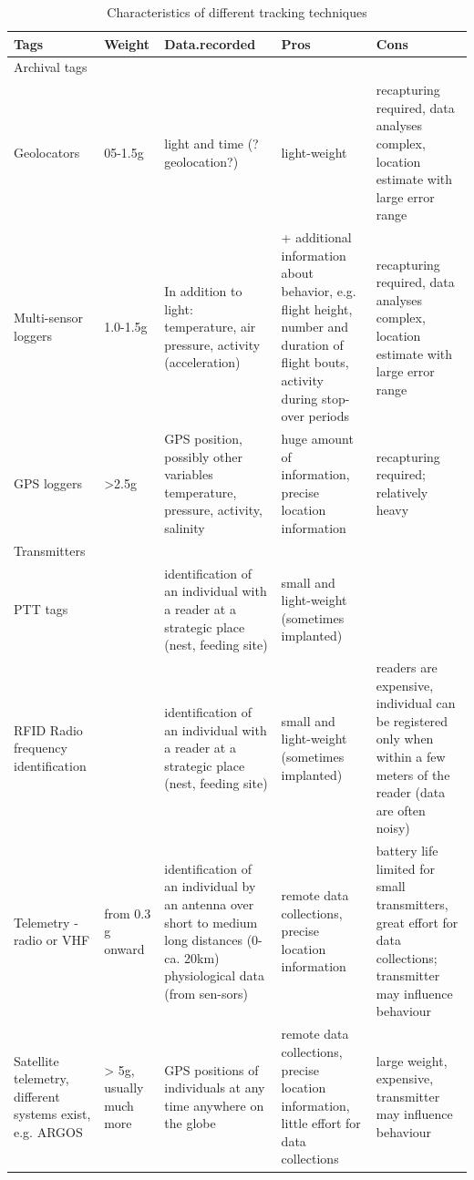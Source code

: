 \documentclass[
]{book}
\begin{document}
\begin{table}
\caption{\label{tab:TrackTechnology}\label{tab:TrackTechnology}Characteristics of different tracking techniques}
\centering
\begin{tabular}[t]{lllll}
\toprule
Tags & Weight & Data.recorded & Pros & Cons\\
\midrule
Archival tags &  &  &  & \\
Geolocators & 05-1.5g & light and time (?geolocation?) & light-weight & recapturing required, data analyses complex, location estimate with large error range\\
Multi-sensor loggers & 1.0-1.5g & In addition to light: temperature, air pressure, activity (acceleration) & + additional information about behavior, e.g. flight height, number and duration of flight bouts, activity during stop-over periods & recapturing required, data analyses complex, location estimate with large error range\\
GPS loggers & >2.5g & GPS position, possibly other variables temperature, pressure, activity, salinity & huge amount of information, precise location information & recapturing required; relatively heavy\\
Transmitters &  &  &  & \\
\addlinespace
PTT tags &  & identification of an individual with a reader at a strategic place (nest, feeding site) & small and light-weight (sometimes implanted) & \\
RFID Radio frequency identification &  & identification of an individual with a reader at a strategic place (nest, feeding site) & small and light-weight (sometimes implanted) & readers are expensive, individual can be registered only when within a few meters of the reader (data are often noisy)\\
Telemetry - radio or VHF & from 0.3 g onward & identification of an individual by an antenna over short to medium long distances (0-ca. 20km)
physiological data (from sen-sors) & remote data collections, precise location information & battery life limited for small transmitters, great effort for data collections; transmitter may influence behaviour\\
Satellite telemetry, different systems exist, e.g. ARGOS & > 5g, usually much more & GPS positions of individuals at any time anywhere on the globe & remote data collections, precise location information, little effort for data collections & large weight, expensive, transmitter may influence behaviour\\
\bottomrule
\end{tabular}
\end{table}
\end{document}
